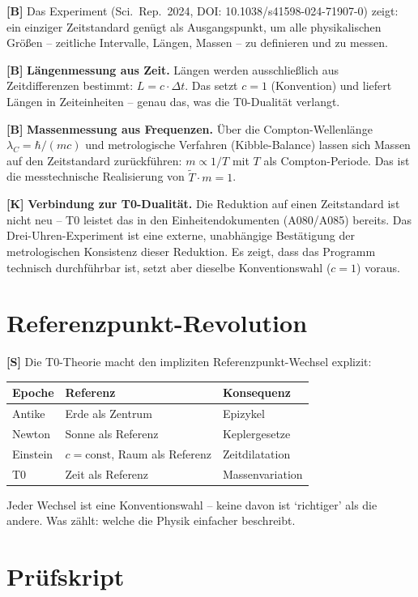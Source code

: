 \textbf{[B]} Das Experiment (Sci.\ Rep.\ 2024, DOI: 10.1038/s41598-024-71907-0)
zeigt: ein einziger Zeitstandard genügt als Ausgangspunkt, um alle physikalischen
Größen -- zeitliche Intervalle, Längen, Massen -- zu definieren und zu messen.

\textbf{[B]} \textbf{Längenmessung aus Zeit.} Längen werden ausschließlich aus
Zeitdifferenzen bestimmt: $L=c\cdot\Delta t$. Das setzt $c=1$ (Konvention) und
liefert Längen in Zeiteinheiten -- genau das, was die T0-Dualität verlangt.

\textbf{[B]} \textbf{Massenmessung aus Frequenzen.} Über die Compton-Wellenlänge
$\lambda_C=\hbar/(mc)$ und metrologische Verfahren (Kibble-Balance) lassen sich
Massen auf den Zeitstandard zurückführen: $m\propto1/T$ mit $T$ als Compton-Periode.
Das ist die messtechnische Realisierung von $\tilde T\cdot m=1$.

\textbf{[K]} \textbf{Verbindung zur T0-Dualität.} Die Reduktion auf einen
Zeitstandard ist nicht neu -- T0 leistet das in den Einheitendokumenten (A080/A085)
bereits. Das Drei-Uhren-Experiment ist eine externe, unabhängige Bestätigung der
metrologischen Konsistenz dieser Reduktion. Es zeigt, dass das Programm
technisch durchführbar ist, setzt aber dieselbe Konventionswahl ($c=1$) voraus.

\section{Referenzpunkt-Revolution}

\textbf{[S]} Die T0-Theorie macht den impliziten Referenzpunkt-Wechsel explizit:
\begin{center}
\renewcommand{\arraystretch}{1.3}
{\small
\begin{tabular}{lll}
\toprule
Epoche & Referenz & Konsequenz \\
\midrule
Antike & Erde als Zentrum & Epizykel \\
Newton & Sonne als Referenz & Keplergesetze \\
Einstein & $c=\text{const}$, Raum als Referenz & Zeitdilatation \\
T0 & Zeit als Referenz & Massenvariation \\
\bottomrule
\end{tabular}
}
\renewcommand{\arraystretch}{1.0}
\end{center}
Jeder Wechsel ist eine Konventionswahl -- keine davon ist `richtiger' als die andere.
Was zählt: welche die Physik einfacher beschreibt.

\section{Prüfskript}

